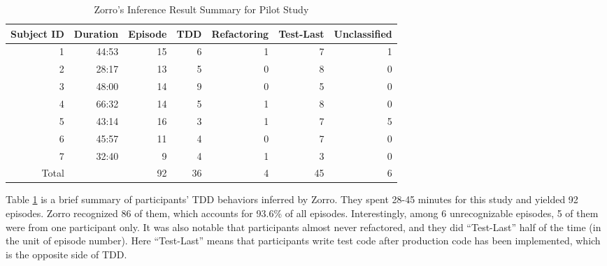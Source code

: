 \begin{table}[htbp]
\centering
  \caption{Zorro's Inference Result Summary for Pilot Study}\label{tab:ZorroPilotStudy}  
  \begin{tabular}{|r|r|r|r|r|r|r|}
  \hline
    Subject ID & Duration & Episode & TDD & Refactoring & Test-Last & Unclassified \\ \hline
    1 & 44:53 & 15 &  6 &  1 &  7 & 1 \\ \hline
    2 & 28:17 & 13 &  5 &  0 &  8 & 0 \\ \hline
    3 & 48:00 & 14 &  9 &  0 &  5 & 0 \\ \hline
    4 & 66:32 & 14 &  5 &  1 &  8 & 0 \\ \hline
    5 & 43:14 & 16 &  3 &  1 &  7 & 5 \\ \hline
    6 & 45:57 & 11 &  4 &  0 &  7 & 0 \\ \hline
    7 & 32:40 &  9 &  4 &  1 &  3 & 0 \\ \hline \hline
    Total &   & 92 & 36 &  4 & 45 & 6 \\ 
  \hline
  \end{tabular}
\end{table}
Table \ref{tab:ZorroPilotStudy} is a brief summary of participants'
TDD behaviors inferred by Zorro. They spent 28-45 minutes for this
study and yielded 92 episodes. Zorro recognized 86 of them, which
accounts for 93.6\% of all episodes. Interestingly, among 6
unrecognizable episodes, 5 of them were from one participant only. It
was also notable that participants almost never refactored, and they
did ``Test-Last'' half of the time (in the unit of episode number).
Here ``Test-Last'' means that participants write test code after
production code has been implemented, which is the opposite side of
TDD.

